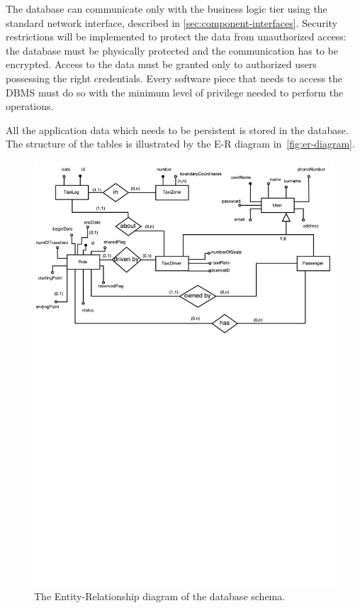 The database can communicate only with the business logic tier using the standard network interface, described in \autoref{sec:component-interfaces}.
Security restrictions will be implemented to protect the data from unauthorized access: the database must be physically protected and the communication has to be encrypted. Access to the data must be granted only to authorized users possessing the right credentials. Every software piece that needs to access the DBMS must do so with the minimum level of privilege needed to perform the operations.

All the application data which needs to be persistent is stored in the database. The structure of the tables is illustrated by the E-R diagram in~\autoref{fig:er-diagram}.

\begin{figure}
    \centering
    \includegraphics[width=\textwidth]{diagrams/er_diagram}
    \caption{The Entity-Relationship diagram of the database schema.}
    \label{fig:er-diagram}
\end{figure}

